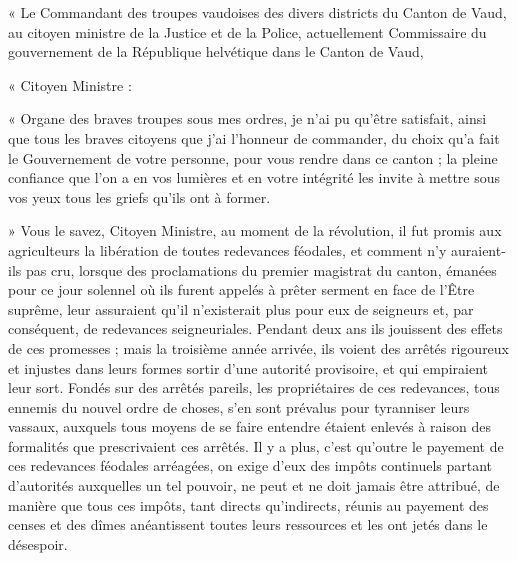 \documentclass[french,twoside]{book} %
\newenvironment{quoteblock}%
  {\begin{quoting}}
  {\end{quoting}}
\newenvironment{quotebar}{%
    \def\FrameCommand{{\color{rubric!10!}\vrule width 0.5em} \hspace{0.9em}}%
    \def\OuterFrameSep{\itemsep} %
    \MakeFramed {\advance\hsize-\width \FrameRestore}
  }%
  {%
    \endMakeFramed
  }
\renewenvironment{quoteblock}%
  {%
    \savenotes
    \setstretch{0.9}
    \begin{quotebar}
  }
  {%
    \end{quotebar}
    \spewnotes
  }
\begin{document}
\begin{quoteblock}
 \noindent « Le Commandant des troupes vaudoises des divers districts du Canton de Vaud, au citoyen ministre de la Justice et de la Police, actuellement Commissaire du gouvernement de la République helvétique dans le Canton de Vaud,\par
 « Citoyen Ministre :\par
 « Organe des braves troupes sous mes ordres, je n’ai pu qu’être satisfait, ainsi que tous les braves citoyens que j’ai l’honneur de commander, du choix qu’a fait le Gouvernement de votre personne, pour vous rendre dans ce canton ; la pleine confiance que l’on a en vos lumières et en votre intégrité les invite à mettre sous vos yeux tous les griefs qu’ils ont à former.\par
 » Vous le savez, Citoyen Ministre, au moment de la révolution, il fut promis aux agriculteurs la libération de toutes redevances féodales, et comment n’y auraient-ils pas cru, lorsque des proclamations du premier magistrat du canton, émanées pour ce jour solennel où ils furent appelés à prêter serment en face de l’Être suprême, leur assuraient qu’il n’existerait plus pour eux de seigneurs et, par conséquent, de redevances seigneuriales. Pendant deux ans ils jouissent des effets de ces promesses ; mais la troisième année arrivée, ils voient des arrêtés rigoureux et injustes dans leurs formes sortir d’une autorité provisoire, et qui empiraient leur sort. Fondés sur des arrêtés pareils, les propriétaires de ces redevances, tous ennemis du nouvel ordre de choses, s’en sont prévalus pour tyranniser leurs vassaux, auxquels tous moyens de se faire entendre étaient enlevés à raison des formalités que prescrivaient ces arrêtés. Il y a plus, c’est qu’outre le payement de ces redevances féodales arréagées, on exige d’eux des impôts continuels partant d’autorités auxquelles un tel pouvoir, ne peut et ne doit jamais être attribué, de manière que tous ces impôts, tant directs qu’indirects, réunis au payement des censes et des dîmes anéantissent toutes leurs ressources et les ont jetés dans le désespoir.\par

\end{quoteblock}
\end{document}
